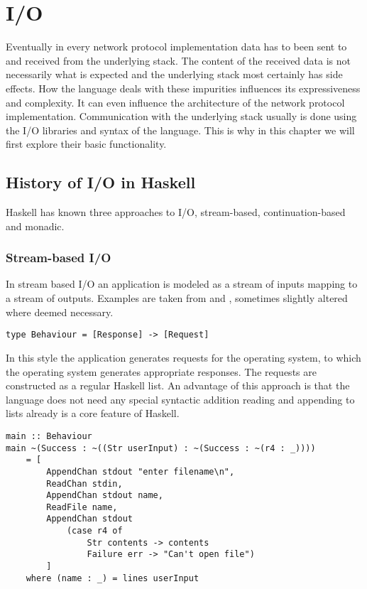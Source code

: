 \chapter{I/O}
Eventually in every network protocol implementation data has to been sent to and received from the underlying stack.
The content of the received data is not necessarily what is expected and the underlying stack most certainly has side effects.
How the language deals with these impurities influences its expressiveness and complexity.
It can even influence the architecture of the network protocol implementation.
Communication with the underlying stack usually is done using the I/O libraries and syntax of the language.
This is why in this chapter we will first explore their basic functionality.
\section{History of I/O in Haskell}
Haskell has known three approaches to I/O, stream-based, continuation-based and monadic.
\subsection{Stream-based I/O}
In stream based I/O an application is modeled as a stream of inputs mapping to a stream of outputs. Examples are taken from \cite{hudak_history_2007} and \cite{hudak_conception_1989}, sometimes slightly altered where deemed necessary.

\begin{lstlisting}[caption={Mapping of responses to requests}]
type Behaviour = [Response] -> [Request]
\end{lstlisting}

In this style the application generates requests for the operating system, to which the operating system generates appropriate responses. The requests are constructed as a regular Haskell list. An advantage of this approach is that the language does not need any special syntactic addition reading and appending to lists already is a core feature of Haskell.

\begin{lstlisting}[caption={Example of stream-based I/O in Haskell}]
main :: Behaviour
main ~(Success : ~((Str userInput) : ~(Success : ~(r4 : _))))
	= [
		AppendChan stdout "enter filename\n",
		ReadChan stdin,
		AppendChan stdout name,
		ReadFile name,
		AppendChan stdout
			(case r4 of
				Str contents -> contents
				Failure err -> "Can't open file")
		]
	where (name : _) = lines userInput
\end{lstlisting}

